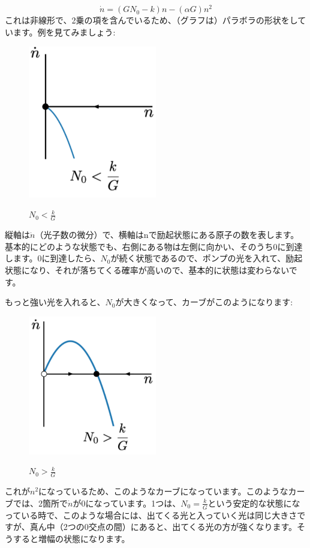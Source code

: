 \begin{equation}
\dot{n}=\left(G N_{0}-k\right) n-(\alpha G) n^{2}
\end{equation}
これは非線形で、2乗の項を含んでいるため、（グラフは）パラボラの形状をしています。例を見てみましょう:

\begin{figure}[H]
    \centering
    \includegraphics[width=0.5\textwidth]{lesson5/fully_negative_parabola.pdf}
    \label{図: 1}
    \caption{$N_0 < \frac{k}{G}$}
\end{figure}
縦軸は$\Dot{n}$（光子数の微分）で、横軸はnで励起状態にある原子の数を表します。基本的にどのような状態でも、右側にある物は左側に向かい、そのうち0に到達します。0に到達したら、$N_0$が続く状態であるので、ポンプの光を入れて、励起状態になり、それが落ちてくる確率が高いので、基本的に状態は変わらないです。

もっと強い光を入れると、$N_0$が大きくなって、カーブがこのようになります:
\begin{figure}[H]
    \centering
    \includegraphics[width=0.5\textwidth]{lesson5/partially_negative_parabola.pdf}
    \label{図: 1}
    \caption{$N_0 > \frac{k}{G}$}
\end{figure}
これが$n^{2}$になっているため、このようなカーブになっています。このようなカーブでは、2箇所で$\Dot{n}$が0になっています。1つは、$N_0=\frac{k}{G}$という安定的な状態になっている時で、このような場合には、出てくる光と入っていく光は同じ大きさですが、真ん中（2つの0交点の間）にあると、出てくる光の方が強くなります。そうすると増幅の状態になります。

